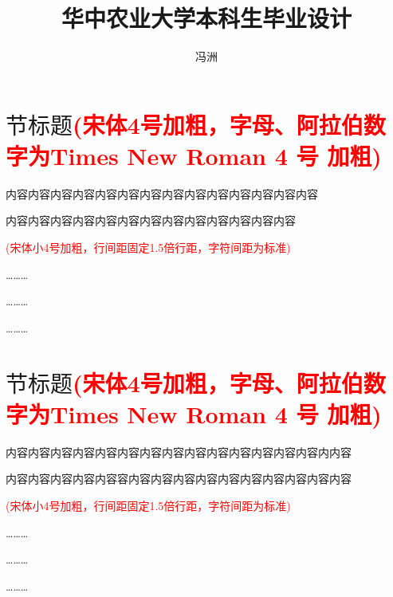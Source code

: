 \documentclass[11pt,a4paper]{article}
\title{华中农业大学本科生毕业设计 \break{（论文）开题报告} \vspace{-200em}}
\author{冯洲}
\date{}
\newcommand{\xiaosihao}{\fontsize{12pt}{24pt}\selectfont}
\newcommand{\wuhao}{\fontsize{10.5pt}{18pt}\selectfont}
\newcommand\seccontent{
	\xiaosihao %
    \setlength{\parindent}{2em} %
    \setlength{\parskip}{0pt}
   }
\theoremstyle{definition}
\numberwithin{equation}{section}
\begin{document}







\section{${节标题}${\wuhao  \textcolor{red}{(宋体4号加粗，字母、阿拉伯数字为Times New Roman 4 号 加粗)}}}	\seccontent
 内容内容内容内容内容内容内容内容内容内容内容内容内容内容 

内容内容内容内容内容内容内容内容内容内容内容内容内容 

{\wuhao  \textcolor{red}{(宋体小4号加粗，行间距固定1.5倍行距，字符间距为标准)}}

\hspace{15em} \ldots\ldots\ldots

\hspace{15em} \ldots\ldots\ldots

\hspace{15em} \ldots\ldots\ldots











\section{$ 节标题 ${\wuhao  \textcolor{red}{(宋体4号加粗，字母、阿拉伯数字为Times New Roman 4 号 加粗)}}}	\seccontent
内容内容内容内容内容内容内容内容内容内容内容内容内容内容内内容

内容内容内容内容内容容内容内容内容内容内容内容内容内容内容内容

{\wuhao  \textcolor{red}{(宋体小4号加粗，行间距固定1.5倍行距，字符间距为标准)}}

\hspace{15em} \ldots\ldots\ldots

\hspace{15em} \ldots\ldots\ldots

\hspace{15em} \ldots\ldots\ldots
\end{document}

